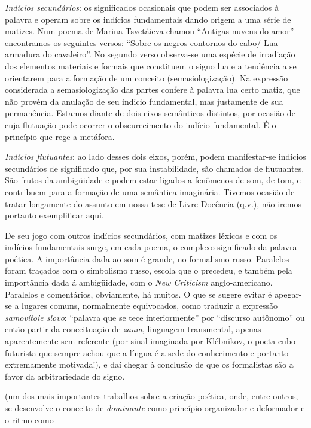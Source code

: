 {  \emph{Indícios secundários}: os significados ocasionais que podem ser
  associados à palavra e operam sobre os indícios fundamentais dando
  origem a uma série de matizes. Num poema de Marina Tsvetáieva chamou
  ``Antigas nuvens do amor'' encontramos os seguintes versos: ``Sobre os
  negros contornos do cabo/ Lua -- armadura do cavaleiro''. No segundo
  verso observa-se uma espécie de irradiação dos elementos materiais e
  formais que constituem o signo lua e a tendência a se orientarem para
  a formação de um conceito (semasiologização). Na expressão considerada
  a semasiologização das partes confere à palavra lua certo matiz, que
  não provém da anulação de seu indicio fundamental, mas justamente de
  sua permanência. Estamos diante de dois eixos semânticos distintos,
  por ocasião de cuja flutuação pode ocorrer o obscurecimento do indício
  fundamental. É o princípio que rege a metáfora.

  \emph{Indícios flutuantes}: ao lado desses dois eixos, porém, podem
  manifestar-se indícios secundários de significado que, por sua
  instabilidade, são chamados de flutuantes. São frutos da ambigüidade e
  podem estar ligados a fenômenos de som, de tom, e contribuem para a
  formação de uma semântica imaginária. Tivemos ocasião de tratar
  longamente do assunto em nossa tese de Livre-Docência (q.v.), não
  iremos portanto exemplificar aqui.

  De seu jogo com outros indícios secundários, com matizes léxicos e com
  os indícios fundamentais surge, em cada poema, o complexo significado
  da palavra poética. A importância dada ao som é grande, no formalismo
  russo. Paralelos foram traçados com o simbolismo russo, escola que o
  precedeu, e também pela importância dada á ambigüidade, com o
  \emph{New Criticism} anglo-americano. Paralelos e comentários,
  obviamente, há muitos. O que se sugere evitar é apegar-se a lugares
  comuns, normalmente equivocados, como traduzir a expressão
  \emph{samovítoie slovo}: ``palavra que se tece interiormente'' por
  ``discurso autônomo'' ou então partir da conceituação de \emph{zaum},
  linguagem transmental, apenas aparentemente sem referente (por sinal
  imaginada por Klébnikov, o poeta cubo-futurista que sempre achou que a
  língua é a sede do conhecimento e portanto extremamente motivada!), e
  daí chegar à conclusão de que os formalistas são a favor da
  arbitrariedade do signo.} (um dos mais importantes trabalhos sobre a
criação poética, onde, entre outros, se desenvolve o conceito de
\emph{dominante} como princípio organizador e deformador e o ritmo como
